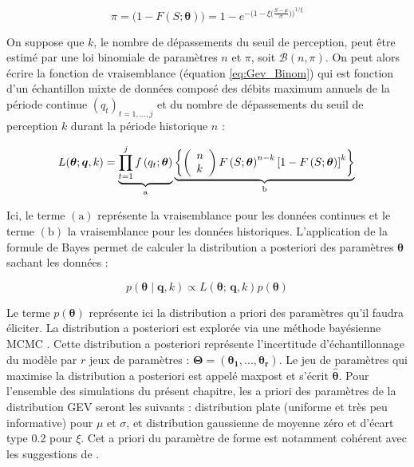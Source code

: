 \documentclass[11pt]{article}
\begin{document}
		\begin{equation}
			\pi = \biggl( 1 - F(S;\boldsymbol{\theta})\biggl) = 1 - e^{-\biggl(1-\xi\bigl(\frac{S-\mu}{\sigma}\bigl)\biggl)^{1/\xi} }		
		\end{equation}
			 
	On suppose que $k$, le nombre de dépassements du seuil de perception, peut être estimé par une loi binomiale de paramètres $n$ et $\pi$, soit $\mathcal{B}(n,\pi)$. On peut alors écrire la fonction de vraisemblance (équation \ref{eq:Gev_Binom}) qui est fonction d'un échantillon mixte de données composé des débits maximum annuels de la période continue $(q_t)_{t=1,...,j}$ et du nombre de dépassements du seuil de perception $k$ durant la période historique $n$ :
		
			\begin{equation}
			L(\boldsymbol{\theta} ; \boldsymbol{q}, k) = \underbrace{\prod_{t=1}^j f\left(q_t;\boldsymbol{\theta}\right)}_{\mathrm{a}} \underbrace{\left\{\left(\begin{array}{l}
			n \\
			k
			\end{array}\right) F\left(S;\boldsymbol{\theta}\right)^{n-k}\left[1-F\left(S;\boldsymbol{\theta}\right)\right]^k\right\}}_{\mathrm{b}} \\
			\label{eq:Gev_Binom}
			\end{equation}
			
			Ici, le terme \textit{$\mathrm{(a)}$} représente la vraisemblance pour les données continues et le terme \textit{$\mathrm{(b)}$} la vraisemblance pour les données historiques. L'application de la formule de Bayes permet de calculer la distribution a posteriori des paramètres $\boldsymbol{\theta}$ sachant les données :
			
			\begin{equation}
				p(\boldsymbol{\theta} \mid \boldsymbol{q},k) \propto L(\boldsymbol{\theta};\,\boldsymbol{q},k) p(\boldsymbol{\theta})
				\label{eq:BayesBinom}
			\end{equation}
	
		Le terme $p(\boldsymbol{\theta})$ représente ici la distribution a priori des paramètres qu'il faudra éliciter. La distribution a posteriori est explorée via une méthode bayésienne MCMC \citep{renard_application_2006}. Cette distribution a posteriori représente l'incertitude d'échantillonnage du modèle par $r$ jeux de paramètres : $\boldsymbol{\Theta} = (\boldsymbol{\theta_1},...,\boldsymbol{\theta_r})$. Le jeu de paramètres qui maximise la distribution a posteriori est appelé maxpost et s'écrit $\boldsymbol{ \hat{\theta} }$. Pour l'ensemble des simulations du présent chapitre, les a priori des paramètres de la distribution GEV seront les suivants : distribution plate (uniforme et très peu informative) pour $\mu$ et $\sigma$, et distribution gaussienne de moyenne zéro et d'écart type 0.2 pour $\xi$. Cet a priori du paramètre de forme est notamment cohérent avec les suggestions de \citet{martins_generalized_2000}.
	
\end{document}
